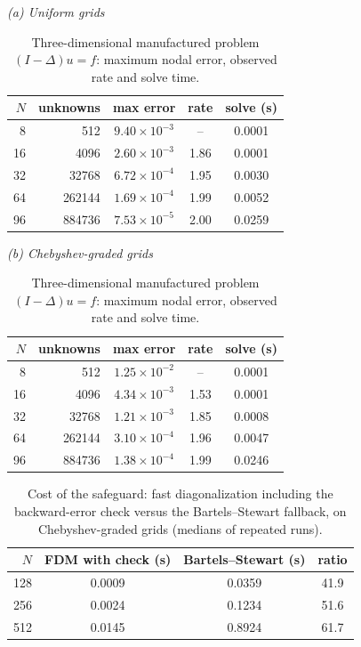 \documentclass[11pt]{article}
\begin{document}
\begin{table}[htbp]\centering\small
\caption{Three-dimensional manufactured problem $(I-\Delta)u=f$: maximum nodal error, observed rate and solve time.}
\textit{(a) Uniform grids}\\[2pt]
\begin{tabular}{rr cc c}
\toprule
$N$ & unknowns & max error & rate & solve (s)\\
\midrule
8 & 512 & $9.40{\times}10^{-3}$ & -- & 0.0001\\
16 & 4096 & $2.60{\times}10^{-3}$ & 1.86 & 0.0001\\
32 & 32768 & $6.72{\times}10^{-4}$ & 1.95 & 0.0030\\
64 & 262144 & $1.69{\times}10^{-4}$ & 1.99 & 0.0052\\
96 & 884736 & $7.53{\times}10^{-5}$ & 2.00 & 0.0259\\
\bottomrule
\end{tabular}

\medskip
\textit{(b) Chebyshev-graded grids}\\[2pt]
\begin{tabular}{rr cc c}
\toprule
$N$ & unknowns & max error & rate & solve (s)\\
\midrule
8 & 512 & $1.25{\times}10^{-2}$ & -- & 0.0001\\
16 & 4096 & $4.34{\times}10^{-3}$ & 1.53 & 0.0001\\
32 & 32768 & $1.21{\times}10^{-3}$ & 1.85 & 0.0008\\
64 & 262144 & $3.10{\times}10^{-4}$ & 1.96 & 0.0047\\
96 & 884736 & $1.38{\times}10^{-4}$ & 1.99 & 0.0246\\
\bottomrule
\end{tabular}
\end{table}

\clearpage
\begin{table}[htbp]\centering\small
\caption{Cost of the safeguard: fast diagonalization including the backward-error check versus the Bartels--Stewart fallback, on Chebyshev-graded grids (medians of repeated runs).}
\begin{tabular}{r ccc}
\toprule
$N$ & FDM with check (s) & Bartels--Stewart (s) & ratio\\
\midrule
128 & 0.0009 & 0.0359 & 41.9\\
256 & 0.0024 & 0.1234 & 51.6\\
512 & 0.0145 & 0.8924 & 61.7\\
\bottomrule
\end{tabular}
\end{table}
\end{document}
